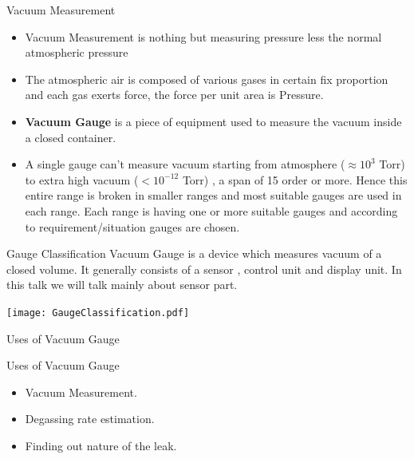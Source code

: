 \documentclass[11pt]{beamer}
\begin{document}
\begin{frame}{Vacuum Measurement}


\begin{itemize}
\item Vacuum Measurement is nothing but measuring pressure less the normal atmospheric pressure
\item The atmospheric air is composed of various gases in certain fix proportion and each gas exerts force, the force per unit area is Pressure. 
\item \textbf{Vacuum Gauge} is a piece of equipment used to measure the vacuum inside a closed container.

\item A single gauge can’t measure vacuum starting from atmosphere ($\approx 10^3 $ Torr) to extra high vacuum ($ < 10^{-12} $ Torr) , a span of 15 order or more. Hence this entire range is broken in smaller ranges and most suitable gauges are used in each range. Each range is having one or more suitable gauges and according to requirement/situation gauges are chosen.
\end{itemize}







\end{frame}


\begin{frame}{Gauge Classification}
Vacuum Gauge is a device which measures vacuum of a closed volume. It generally consists of a sensor , control unit and display unit. In this talk we will talk mainly about sensor part.
\begin{center}
\texttt{[image: GaugeClassification.pdf]}
\end{center}

\end{frame}



\begin{frame}{Uses of Vacuum Gauge}

	\begin{block}{Uses of Vacuum Gauge}

	   \begin{itemize}
          
           \item Vacuum Measurement.
            
            \item Degassing rate estimation.
            
            \item Finding out nature of the leak.	      
	      
	    \end{itemize}
	
	
	\end{block}

\end{frame}
\end{document}
